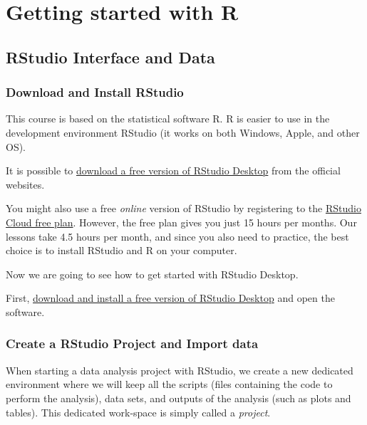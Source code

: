 \documentclass[
]{article}
\begin{document}
\hypertarget{getting-started-with-r}{%
\section{Getting started with R}\label{getting-started-with-r}}

\hypertarget{rstudio-interface-and-data}{%
\subsection{RStudio Interface and Data}\label{rstudio-interface-and-data}}

\hypertarget{download-and-install-rstudio}{%
\subsubsection{Download and Install RStudio}\label{download-and-install-rstudio}}

This course is based on the statistical software R. R is easier to use in the development environment RStudio (it works on both Windows, Apple, and other OS).

It is possible to \href{https://rstudio.com/products/rstudio/download/}{download a free version of RStudio Desktop} from the official websites.

You might also use a free \emph{online} version of RStudio by registering to the \href{https://rstudio.cloud}{RStudio Cloud free plan}. However, the free plan gives you just 15 hours per months. Our lessons take 4.5 hours per month, and since you also need to practice, the best choice is to install RStudio and R on your computer.

Now we are going to see how to get started with RStudio Desktop.

First, \href{https://rstudio.com/products/rstudio/download/}{download and install a free version of RStudio Desktop} and open the software.

\hypertarget{create-a-rstudio-project-and-import-data}{%
\subsubsection{Create a RStudio Project and Import data}\label{create-a-rstudio-project-and-import-data}}

When starting a data analysis project with RStudio, we create a new dedicated environment where we will keep all the scripts (files containing the code to perform the analysis), data sets, and outputs of the analysis (such as plots and tables). This dedicated work-space is simply called a \emph{project}.
\end{document}
